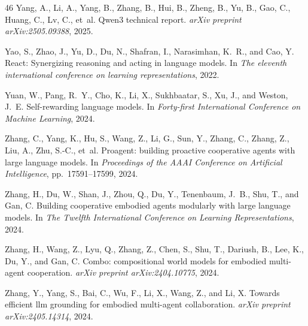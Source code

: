 \documentclass{article}
\theoremstyle{plain}
\theoremstyle{definition}
\theoremstyle{remark}
\begin{document}
\begin{thebibliography}{46}
Yang, A., Li, A., Yang, B., Zhang, B., Hui, B., Zheng, B., Yu, B., Gao, C.,
  Huang, C., Lv, C., et~al.
\newblock Qwen3 technical report.
\newblock \emph{arXiv preprint arXiv:2505.09388}, 2025.

Yao, S., Zhao, J., Yu, D., Du, N., Shafran, I., Narasimhan, K.~R., and Cao, Y.
\newblock React: Synergizing reasoning and acting in language models.
\newblock In \emph{The eleventh international conference on learning
  representations}, 2022.

Yuan, W., Pang, R.~Y., Cho, K., Li, X., Sukhbaatar, S., Xu, J., and Weston,
  J.~E.
\newblock Self-rewarding language models.
\newblock In \emph{Forty-first International Conference on Machine Learning},
  2024.

Zhang, C., Yang, K., Hu, S., Wang, Z., Li, G., Sun, Y., Zhang, C., Zhang, Z.,
  Liu, A., Zhu, S.-C., et~al.
\newblock Proagent: building proactive cooperative agents with large language
  models.
\newblock In \emph{Proceedings of the AAAI Conference on Artificial
  Intelligence}, pp.\  17591--17599, 2024{}.

Zhang, H., Du, W., Shan, J., Zhou, Q., Du, Y., Tenenbaum, J.~B., Shu, T., and
  Gan, C.
\newblock Building cooperative embodied agents modularly with large language
  models.
\newblock In \emph{The Twelfth International Conference on Learning
  Representations}, 2024{}.

Zhang, H., Wang, Z., Lyu, Q., Zhang, Z., Chen, S., Shu, T., Dariush, B., Lee,
  K., Du, Y., and Gan, C.
\newblock Combo: compositional world models for embodied multi-agent
  cooperation.
\newblock \emph{arXiv preprint arXiv:2404.10775}, 2024{}.

Zhang, Y., Yang, S., Bai, C., Wu, F., Li, X., Wang, Z., and Li, X.
\newblock Towards efficient llm grounding for embodied multi-agent
  collaboration.
\newblock \emph{arXiv preprint arXiv:2405.14314}, 2024{}.


\end{thebibliography}
\end{document}
